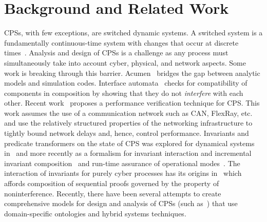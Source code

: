 \section{Background and Related Work}
\label{sec:related_work}

CPSs, with few exceptions, are switched dynamic systems. A switched system is a
fundamentally continuous-time system with changes that occur at discrete
times~\cite{liberzon03}. Analysis and design of CPSs is a challenge as any
process must simultaneously take into account cyber, physical, and network
aspects. Some work is breaking through this barrier.
Acumen~\cite{Zhu:2010:MEE:1795194.1795196} bridges the gap between analytic
models and simulation codes. Interface automata~\cite{Alfaro} checks for
compatibility of components in composition by showing that they do not
\emph{interfere} with each other. Recent work~\cite{DAC_2012_CPS_verification}
proposes a performance verification technique for CPS. This work assumes the use
of a communication network such as CAN, FlexRay, etc. and use the relatively
structured properties of the networking infrastructure to tightly bound network
delays and, hence, control performance. Invariants and predicate transformers on
the state of CPS was explored for dynamical systems in~\cite{DBLP:SitzoffG93}
and more recently as a formalism for invariant interaction and incremental
invariant composition~\cite{5587717} and run-time assurance of operational
modes~\cite{Bak2010}. The interaction of invariants for purely cyber processes
has its origins in~\cite{OwickiGries1976} which affords composition of
sequential proofs governed by the property of noninterference.
Recently, there have been several attempts to create comprehensive models for
design and analysis of CPSs (such
as~\cite{DerlerLeeSangiovanniVincentelli12_ModelingCyberPhysicalSystems,
GarlanKrogh2010,cyphy}) that use domain-specific ontologies and hybrid systems
techniques.

